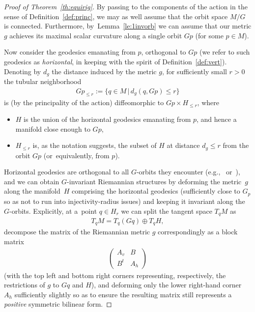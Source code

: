 \documentclass[pdftex]{sigma}%
\numberwithin{equation}{section}
\begin{document}
\begin{proof}[Proof of Theorem~\ref{th:equirig}]
 By passing to the components of the action in the sense of Definition~\ref{def:princ}, we may as well assume that the orbit space $M/G$ is connected. Furthermore, by~Lemma~\ref{le:1invorb} we can assume that our metric $g$ achieves its maximal scalar curvature along a single orbit $Gp$ (for some $p\in M$).

 Now consider the geodesics emanating from $p$, orthogonal to $Gp$ (we refer to such geodesics as {\it horizontal}, in keeping with the spirit of Definition~\ref{def:vert}). Denoting by $d_g$ the distance induced by the metric $g$, for sufficiently small $r>0$ the tubular neighborhood
 \begin{gather*}
 Gp_{\le r}:=\{q\in M\,|\, d_g(q,Gp)\le r\}
 \end{gather*}
 is (by the principality of the action) diffeomorphic to $Gp\times H_{\le r}$, where
 \begin{itemize}\itemsep=0pt
 \item $H$ is the union of the horizontal geodesics emanating from $p$, and hence a manifold close enough to $Gp$,
 \item $H_{\le r}$ is, as the notation suggests, the subset of $H$ at distance $d_g\le r$ from the orbit $Gp$ (or~equivalently, from $p$).
 \end{itemize}
 Horizontal geodesics are orthogonal to all $G$-orbits they encounter (e.g.,~\cite[Lemma 9.44]{bes} or~\cite[Section~1.1]{haef-riem}), and we can obtain $G$-invariant Riemannian structures by deforming the metric~$g$ along the manifold~$H$ comprising the horizontal geodesics (sufficiently close to $G_p$ so as not to run into injectivity-radius issues) and keeping it invariant along the $G$-orbits. Explicitly, at a~point $q\in H_r$ we can split the tangent space $T_qM$ as
 \begin{gather*}
 T_qM = T_q(Gq)\oplus T_qH,
 \end{gather*}
 decompose the matrix of the Riemannian metric $g$ correspondingly as a block matrix
 \begin{gather*}
 \begin{pmatrix}
 A_v&B\\
 B^t&A_h
 \end{pmatrix}
 \end{gather*}
 (with the top left and bottom right corners representing, respectively, the restrictions of $g$ to $Gq$ and $H$), and deforming only the lower right-hand corner $A_h$ sufficiently slightly so as to ensure the resulting matrix still represents a {\it positive} symmetric bilinear form.


\end{proof}
\end{document}
